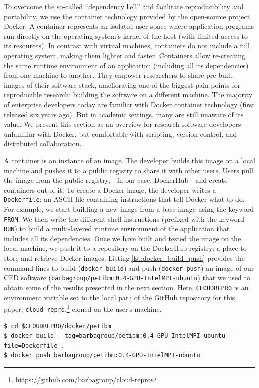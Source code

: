 \documentclass[10pt,journal,compsoc]{IEEEtran}
\begin{document}
To overcome the so-called ``dependency hell'' and facilitate reproducibility and portability, we use the container technology provided by the open-source project Docker.
A container represents an isolated user space where application programs run directly on the operating system's kernel of the host (with limited access to its resources).
In contrast with virtual machines, containers do not include a full operating system, making them lighter and faster.
Containers allow re-creating the same runtime environment of an application (including all its dependencies) from one machine to another. 
They empower researchers to share pre-built images of their software stack, ameliorating one of the biggest pain points for reproducible research: building the software on a different machine. 
The majority of enterprise developers today are familiar with Docker container technology (first released six years ago). 
But in academic settings, many are still unaware of its value. 
We present this section as an overview for research software developers unfamiliar with Docker, but comfortable with scripting, version control, and distributed collaboration.

A container is an instance of an image.
The developer builds this image on a local machine and pushes it to a public registry to share it with other users.
Users pull the image from the public registry,---in our case, DockerHub---and create containers out of it.
To create a Docker image, the developer writes a \texttt{Dockerfile}: an ASCII file containing instructions that tell Docker what to do.
For example, we start building a new image from a base image using the keyword \texttt{FROM}.
We then write the different shell instructions (prefixed with the keyword \texttt{RUN}) to build a multi-layered runtime environment of the application that includes all its dependencies.
Once we have built and tested the image on the local machine, we push it to a repository on the DockerHub registry: a place to store and retrieve Docker images.
Listing \ref{lst:docker_build_push} provides the command lines to build (\texttt{docker build}) and push (\texttt{docker push}) an image of our CFD software (\texttt{barbagroup/petibm:0.4-GPU-IntelMPI-ubuntu}) that we used to obtain some of the results presented in the next section.
Here, \texttt{CLOUDREPRO} is an environment variable set to the local path of the GitHub repository for this paper, \texttt{cloud-repro},\footnote{\url{https://github.com/barbagroup/cloud-repro}} cloned on the user's machine.

\begin{lstlisting}[label=lst:docker_build_push,caption={Build and push a Docker image.}]
$ cd $CLOUDREPRO/docker/petibm
$ docker build --tag=barbagroup/petibm:0.4-GPU-IntelMPI-ubuntu --file=Dockerfile .
$ docker push barbagroup/petibm:0.4-GPU-IntelMPI-ubuntu
\end{lstlisting}
\end{document}
